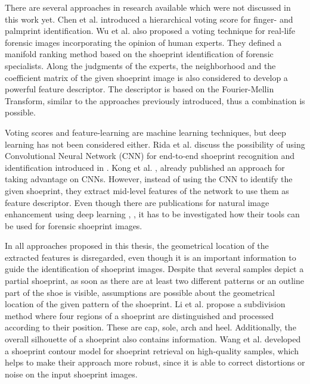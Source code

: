\documentclass[draft,final]{vutinfth} %
\begin{document}
\par
There are several approaches in research available which were not discussed in this work yet.
Chen et al. \cite{chen2013hierarchical} introduced a hierarchical voting score for finger- and palmprint identification.
Wu et al. \cite{wu2019losgsr} also proposed a voting technique for real-life forensic images incorporating the opinion of human experts.
They defined a manifold ranking method based on the shoeprint identification of forensic specialists.
Along the judgments of the experts, the neighborhood and the coefficient matrix of the given shoeprint image is also considered to develop a powerful feature descriptor.
The descriptor is based on the Fourier-Mellin Transform, similar to the approaches previously introduced, thus a combination is possible.
\par
Voting scores and feature-learning are machine learning techniques, but deep learning \cite{lecun2015deep} has not been considered either.
Rida et al. \cite{rida2019forensic} discuss the possibility of using Convolutional Neural Network (CNN) for end-to-end shoeprint recognition and identification introduced in \cite{lecun1998gradient}.
Kong et al. \cite{kong2017cross}, \cite{kong2019cross} already published an approach for taking advantage on CNNs.
However, instead of using the CNN to identify the given shoeprint, they extract mid-level features of the network to use them as feature descriptor.
Even though there are publications for natural image enhancement using deep learning \cite{gharbi2017deep}, \cite{chen2018deep}, it has to be investigated how their tools can be used for forensic shoeprint images.
\par
In all approaches proposed in this thesis, the geometrical location of the extracted features is disregarded, even though it is an important information to guide the identification of shoeprint images. 
Despite that several samples depict a partial shoeprint, as soon as there are at least two different patterns or an outline part of the shoe is visible, assumptions are possible about the geometrical location of the given pattern of the shoeprint.
Li et al. \cite{li2015secondary} propose a subdivision method where four regions of a shoeprint are distinguished and processed according to their position.
These are cap, sole, arch and heel.
Additionally, the overall silhouette of a shoeprint also contains information.
Wang et al. \cite{wang2014automatic} developed a shoeprint contour model for shoeprint retrieval on high-quality samples, which helps to make their approach more robust, since it is able to correct distortions or noise on the input shoeprint images.
\end{document}

